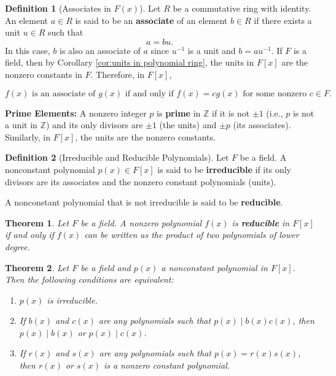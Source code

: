 \documentclass{article}
\newtheorem{theorem}{Theorem}[section]
\theoremstyle{definition}
\newtheorem{definition}{Definition}[section]
\theoremstyle{remark}
\begin{document}
\begin{definition}[Associates in $F(x)$]
Let $R$ be a commutative ring with identity. An element $a \in R$ is said to be an \textbf{associate} of an element $b \in R$ if there exists a unit $u \in R$ such that
\[
a = bu.
\]
In this case, $b$ is also an associate of $a$ since $u^{-1}$ is a unit and $b = au^{-1}$.
If $F$ is a field, then by Corollary \ref{cor:units in polynomial ring}, the units in $F[x]$ are the nonzero constants in $F$. Therefore, in $F[x]$,

\[
f(x) \text{ is an associate of } g(x) \text{ if and only if } f(x) = c g(x) \text{ for some nonzero } c \in F.
\]

\textbf{Prime Elements:}  
A nonzero integer $p$ is \textbf{prime} in $\mathbb{Z}$ if it is not $\pm1$ (i.e., $p$ is not a unit in $\mathbb{Z}$) and its only divisors are $\pm1$ (the units) and $\pm p$ (its associates). Similarly, in $F[x]$, the units are the nonzero constants.

\end{definition}


\begin{definition}[Irreducible and Reducible Polynomials]
Let $F$ be a field. A nonconstant polynomial $p(x) \in F[x]$ is said to be \textbf{irreducible} if its only divisors are its associates and the nonzero constant polynomials (units). 

A nonconstant polynomial that is not irreducible is said to be \textbf{reducible}.
\end{definition}


\begin{theorem} \label{thm:reducibility criterion}
Let $F$ be a field. A nonzero polynomial $f(x)$ is \textbf{reducible} in $F[x]$ if and only if $f(x)$ can be written as the product of two polynomials of lower degree.
\end{theorem}


\begin{theorem} \label{thm:irreducibility conditions}
Let $F$ be a field and $p(x)$ a nonconstant polynomial in $F[x]$. Then the following conditions are equivalent:
\begin{enumerate}
\item $p(x)$ is irreducible.
\item If $b(x)$ and $c(x)$ are any polynomials such that $p(x) \mid b(x)c(x)$, then $p(x) \mid b(x)$ or $p(x) \mid c(x)$.
\item If $r(x)$ and $s(x)$ are any polynomials such that $p(x) = r(x)s(x)$, then $r(x)$ or $s(x)$ is a nonzero constant polynomial.
\end{enumerate}
\end{theorem}
\end{document}
